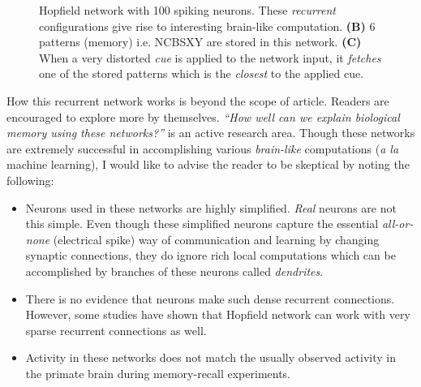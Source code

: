 \documentclass[]{resonance}
\begin{document}
\begin{figure}[!b]
    \centering
    \caption{Hopfield network with 100 spiking neurons. These \emph{recurrent} 
        configurations give rise to interesting brain-like
        computation. \textbf{(B)} 6 patterns (memory) i.e. NCBSXY are stored in this
        network. \textbf{(C)} When a very distorted \textit{cue} is applied to
        the network input, it \textit{fetches} one of the stored patterns which is
        the \emph{closest} to the applied cue.
    }\label{fig:hopfield}
\end{figure}

How this recurrent network works is beyond the scope of article. Readers are
encouraged to explore more by themselves. \emph{``How well can we explain
biological memory using these networks?''} is an active research area.  Though
these networks are extremely successful in accomplishing various
\textit{brain-like} computations (\textit{a la} machine learning), I would like
to advise the reader to be skeptical by noting the following:

\begin{itemize}
    \item  Neurons used in these networks are highly simplified. \textit{Real}
        neurons are not this simple. Even though these simplified neurons
        capture the essential \textit{all-or-none} (electrical spike) way of
        communication and learning by changing synaptic connections, they do
        ignore rich local computations which can be accomplished by branches of
        these neurons called \textit{dendrites}.
    \item  There is no evidence that neurons make such dense recurrent
        connections. However, some studies have shown that Hopfield network can
        work with very sparse recurrent connections as well.
    \item Activity in these networks does not match the usually observed activity 
        in the primate brain during memory-recall experiments.
\end{itemize}
\end{document}

